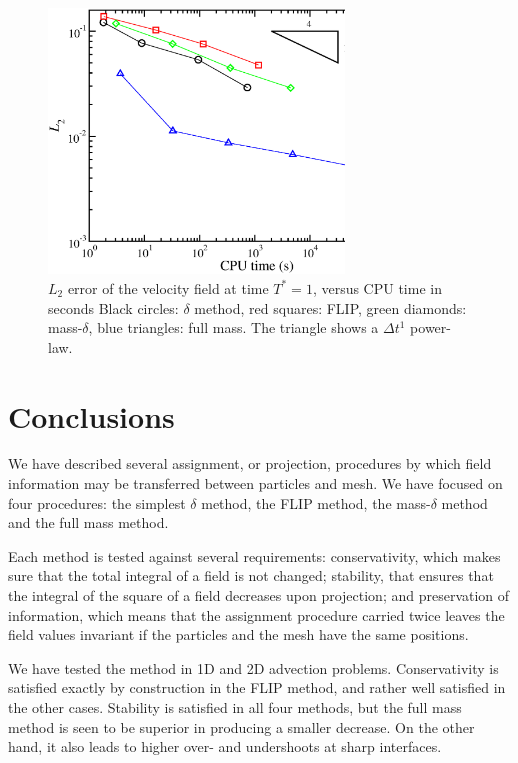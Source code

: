 \documentclass{ws-ijcm}
\begin{document}
\begin{figure}
  \centering
  \includegraphics[width=0.7\textwidth]{L2_x_vs_T}
  \caption{%
    $L_2$ error of the velocity  field at
    time $T^*=1$, versus CPU time in seconds  Black circles: $\delta$
    method, red squares: FLIP, green diamonds: mass-$\delta$, blue triangles:
    full mass. The triangle shows a $\Delta t^1$
    power-law.
    \label{fig:L2_x_vs_T}  }
\end{figure}



\section{Conclusions}
\label{sec:conclusions}


We have described several assignment, or projection, procedures by
which field information may be transferred between particles and mesh.
We have focused on four procedures: the simplest $\delta$ method, the
FLIP method, the mass-$\delta$ method and the full mass method.

Each method is tested against several requirements: conservativity,
which makes sure that the total integral of a field is not changed;
stability, that ensures that the integral of the square of a field
decreases upon projection; and preservation of information, which
means that the assignment procedure carried twice leaves the field
values invariant if the particles and the mesh have the same
positions.

We have tested the method in 1D and 2D advection problems.
Conservativity is satisfied exactly by construction in the FLIP method,
and rather well satisfied in the other cases.  Stability is satisfied
in all four methods, but the full mass method is seen to be superior
in producing a smaller decrease. On the other hand, it also leads to
higher over- and undershoots at sharp interfaces.
\end{document}
